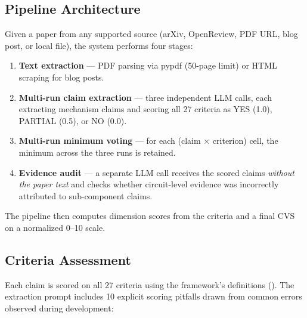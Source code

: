 \documentclass[10pt]{article}
\begin{document}

\subsection{Pipeline Architecture}

Given a paper from any supported source (arXiv, OpenReview, PDF URL, blog post, or local file), the system performs four stages:

\begin{enumerate}[nosep]
    \item \textbf{Text extraction} --- PDF parsing via pypdf (50-page limit) or HTML scraping for blog posts.
    \item \textbf{Multi-run claim extraction} --- three independent LLM calls, each extracting mechanism claims and scoring all 27 criteria as YES (1.0), PARTIAL (0.5), or NO (0.0).
    \item \textbf{Multi-run minimum voting} --- for each (claim $\times$ criterion) cell, the minimum across the three runs is retained.
    \item \textbf{Evidence audit} --- a separate LLM call receives the scored claims \emph{without the paper text} and checks whether circuit-level evidence was incorrectly attributed to sub-component claims.
\end{enumerate}

The pipeline then computes dimension scores from the criteria and a final CVS on a normalized 0--10 scale.

\subsection{Criteria Assessment}

Each claim is scored on all 27 criteria using the framework's definitions (). The extraction prompt includes 10 explicit scoring pitfalls drawn from common errors observed during development:
\end{document}
